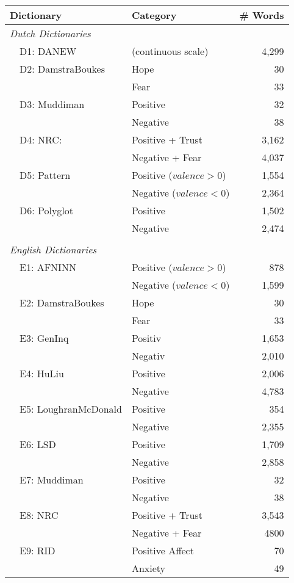 \begin{center}\onehalfspacing
\begin{tabularx}{\linewidth}{lXXr}
\toprule
	 \multicolumn{2}{l}{Dictionary} & Category & \# Words \\ 
	 \midrule
	 \multicolumn{3}{l}{\emph{Dutch Dictionaries }}\\
	 & D1: DANEW & (continuous scale) & 4,299 \\
	 & D2: DamstraBoukes & Hope & 30\\
	 & & Fear &  33\\
	 & D3: Muddiman & Positive& 32\\
	 & & Negative & 38\\
	 & D4: NRC: & Positive + Trust & 3,162\\
	 & & Negative + Fear & 4,037 \\
	 & D5: Pattern & Positive ($valence>0$) & 1,554 \\
	 &  & Negative ($valence<0$) & 2,364 \\
	 & D6: Polyglot & Positive & 1,502\\
	 & & Negative & 2,474\\\\
	 \multicolumn{3}{l}{\emph{English Dictionaries }}\\
	 & E1: AFNINN & Positive ($valence>0$)& 878\\
	 & & Negative ($valence<0$) & 1,599 \\
	 & E2: DamstraBoukes & Hope & 30\\
	 & & Fear & 33 \\
	 & E3: GenInq & Positiv & 1,653\\
	 & & Negativ & 2,010\\
	 & E4: HuLiu & Positive&  2,006\\
	 & & Negative & 4,783\\
	 & E5: LoughranMcDonald & Positive& 354\\
	 & & Negative & 2,355 \\
	 & E6: LSD & Positive & 1,709\\
	 & & Negative & 2,858\\
	 & E7: Muddiman & Positive& 32\\
	 &  & Negative & 38\\
	 & E8: NRC & Positive + Trust & 3,543\\
	 & & Negative + Fear &  4800 \\
	 & E9: RID & Positive Affect & 70\\
	 & & Anxiety & 49\\
\bottomrule
\end{tabularx}
\end{center}
